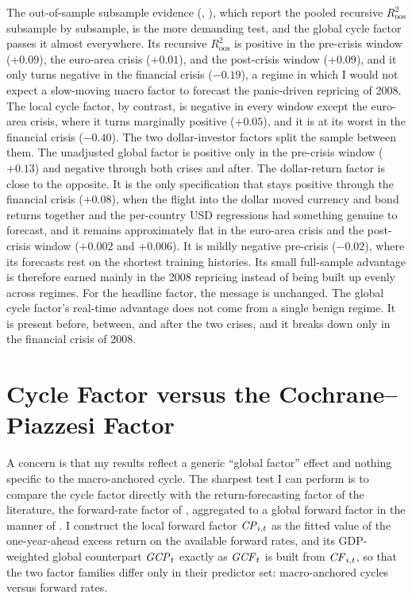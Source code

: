 The out-of-sample subsample evidence (,
), which report the pooled recursive $R^{2}_{\mathrm{oos}}$
subsample by subsample, is the more demanding test, and the global cycle factor
passes it almost everywhere. Its recursive $R^{2}_{\mathrm{oos}}$ is positive in
the pre-crisis window ($+0.09$), the euro-area crisis ($+0.01$), and the
post-crisis window ($+0.09$), and it only turns negative in the financial
crisis ($-0.19$), a regime in which I would not expect a slow-moving macro
factor to forecast the panic-driven repricing of 2008. The local cycle factor,
by contrast, is negative in every window except the euro-area crisis, where it
turns marginally positive ($+0.05$), and it is at its worst in the financial
crisis ($-0.40$). The two dollar-investor factors split the sample between them.
The unadjusted global factor is positive only in the pre-crisis window
($+0.13$) and negative through both crises and after. The dollar-return factor is
close to the opposite. It is the only specification that stays positive
through the financial crisis ($+0.08$), when the flight into the dollar moved
currency and bond returns together and the per-country USD regressions had
something genuine to forecast, and it remains approximately flat in the
euro-area crisis and the post-crisis window ($+0.002$ and $+0.006$). It is
mildly negative pre-crisis ($-0.02$), where its forecasts rest on the shortest
training histories. Its small full-sample advantage is therefore earned mainly
in the 2008 repricing instead of being built up evenly across regimes. For the headline
factor, the message is unchanged. The global cycle factor's real-time
advantage does not come from a single benign regime. It is present before,
between, and after the two crises, and it breaks down only in the financial
crisis of 2008.

\section{Cycle Factor versus the Cochrane--Piazzesi Factor}
\label{sec:rob-cf-cp}

A concern is that my results reflect a generic ``global factor'' effect
and nothing specific to the macro-anchored cycle. The sharpest test I
can perform is to compare the cycle factor directly with the
return-forecasting factor of the literature, the forward-rate factor of
\citet{cochrane2005}, aggregated to a global forward factor in the manner of
\citet{dahlquist2013}. I construct the
local forward factor $\mathit{CP}_{i,t}$ as the fitted value of the one-year-ahead excess
return on the available forward rates, and its GDP-weighted global counterpart
$\mathit{GCP}_{t}$ exactly as $\mathit{GCF}_{t}$ is built from $\mathit{CF}_{i,t}$, so that the two factor
families differ only in their predictor set: macro-anchored cycles versus
forward rates.

